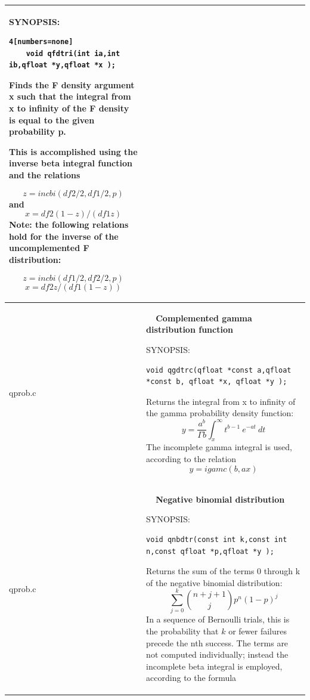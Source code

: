 \documentclass[10pt,a4paper,x11names]{memoir} %
\newcounter{entry}
\newcommand{\TOC}[1] {\addcontentsline{toc}{section}{\theentry\ \  #1} \textbf{\theentry\ \  #1} \par\stepcounter{entry}}
\begin{document}
\begin{longtable}{|p{1.5cm}|p{11.5cm}|}
	{\footnotesize SYNOPSIS:}\vspace{-0.2cm}\index{qfdtri}
	\begin{lstlisting}4[numbers=none]
	void qfdtri(int ia,int ib,qfloat *y,qfloat *x );
	\end{lstlisting}\vspace{-0.2cm}
	
	Finds the F density argument x such that the integral from x to infinity of the F density is equal to the
	given probability p.
	
	This is accomplished using the inverse beta integral function and the relations
	
	$$z = incbi( df2/2, df1/2, p )$$ and
	$$x = df2 (1-z) / (df1 z)$$
	Note: the following relations hold for the inverse of
	the uncomplemented F distribution:
	
	$$z = incbi( df1/2, df2/2, p )$$
	$$x = df2 z / (df1 (1-z))$$
	\\\hline
	qprob.c& \TOC{Complemented gamma distribution function}
	
	{\footnotesize SYNOPSIS:}\vspace{-0.2cm}\index{qgdtrc}
	\begin{lstlisting}[numbers=none]
void qgdtrc(qfloat *const a,qfloat *const b, qfloat *x, qfloat *y );
	\end{lstlisting}\vspace{-0.2cm}
	
	Returns the integral from x to infinity of the gamma
	probability density function:
	$$ y = \frac{a^b}{\Gamma b}\int_{x}^{\infty}t^{b-1}\ e^{-at}\ dt$$
	The incomplete gamma integral is used, according to the
	relation $$y = igamc( b, ax )$$
	\\\hline
	qprob.c& \TOC{Negative binomial distribution}
	
	{\footnotesize SYNOPSIS:}\vspace{-0.2cm}\index{qnbdtr}
	\begin{lstlisting}[numbers=none]
	void qnbdtr(const int k,const int n,const qfloat *p,qfloat *y );
	\end{lstlisting}\vspace{-0.2cm}
	Returns the sum of the terms 0 through k of the negative
	binomial distribution:
	$$ \sum_{j=0}^{k} \binom{n+j+1}{j} p^n (1-p)^j$$
	In a sequence of Bernoulli trials, this is the probability
	that $k$ or fewer failures precede the nth success. The terms are not computed individually; instead the incomplete
	beta integral is employed, according to the formula
	

\end{longtable}
\end{document}
